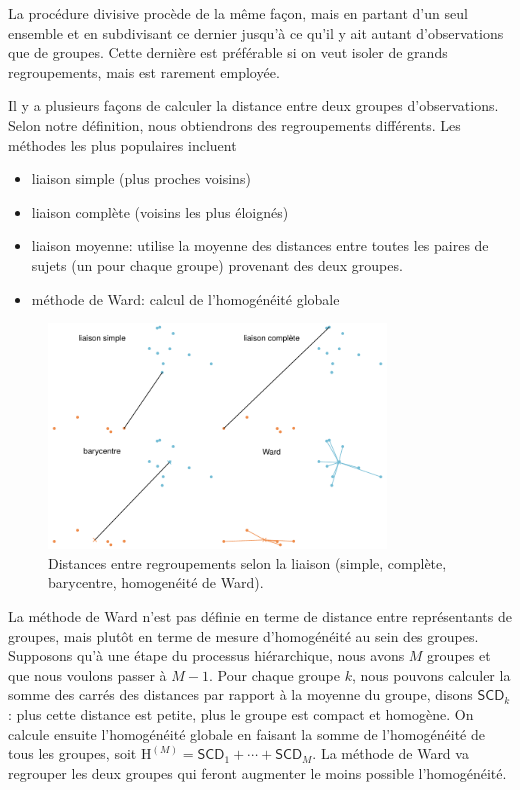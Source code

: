 \documentclass[
  11pt,
  letterpaper,
]{scrbook}
\providecommand{\tightlist}{%
  \setlength{\itemsep}{0pt}\setlength{\parskip}{0pt}}\usepackage{longtable,booktabs,array}
\theoremstyle{definition}
\theoremstyle{remark}
\begin{document}
La procédure divisive procède de la même façon, mais en partant d'un
seul ensemble et en subdivisant ce dernier jusqu'à ce qu'il y ait autant
d'observations que de groupes. Cette dernière est préférable si on veut
isoler de grands regroupements, mais est rarement employée.

Il y a plusieurs façons de calculer la distance entre deux groupes
d'observations. Selon notre définition, nous obtiendrons des
regroupements différents. Les méthodes les plus populaires incluent

\begin{itemize}
\tightlist
\item
  liaison simple (plus proches voisins)
\item
  liaison complète (voisins les plus éloignés)
\item
  liaison moyenne: utilise la moyenne des distances entre toutes les
  paires de sujets (un pour chaque groupe) provenant des deux groupes.
\item
  méthode de Ward: calcul de l'homogénéité globale
\end{itemize}

\begin{figure}[ht!]

{\centering \includegraphics[width=0.8\textwidth,height=\textheight]{./03-regroupements_files/figure-pdf/fig-distances-1.pdf}

}

\caption{\label{fig-distances}Distances entre regroupements selon la
liaison (simple, complète, barycentre, homogenéité de Ward).}

\end{figure}

La méthode de Ward n'est pas définie en terme de distance entre
représentants de groupes, mais plutôt en terme de mesure d'homogénéité
au sein des groupes. Supposons qu'à une étape du processus hiérarchique,
nous avons \(M\) groupes et que nous voulons passer à \(M-1\). Pour
chaque groupe \(k\), nous pouvons calculer la somme des carrés des
distances par rapport à la moyenne du groupe, disons \(\mathsf{SCD}_k\):
plus cette distance est petite, plus le groupe est compact et homogène.
On calcule ensuite l'homogénéité globale en faisant la somme de
l'homogénéité de tous les groupes, soit
\(\mathrm{H}^{(M)} = \mathsf{SCD}_1 + \cdots + \mathsf{SCD}_M\). La
méthode de Ward va regrouper les deux groupes qui feront augmenter le
moins possible l'homogénéité.
\end{document}
